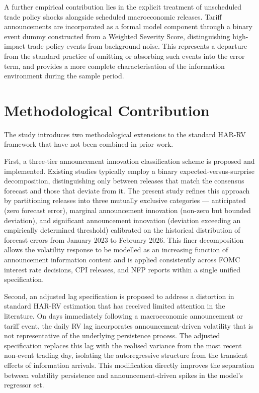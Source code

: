 \documentclass[12pt,a4paper]{report}
\begin{document}
A further empirical contribution lies in the explicit treatment of unscheduled trade policy shocks alongside scheduled macroeconomic releases. Tariff announcements are incorporated as a formal model component through a binary event dummy constructed from a Weighted Severity Score, distinguishing high-impact trade policy events from background noise. This represents a departure from the standard practice of omitting or absorbing such events into the error term, and provides a more complete characterisation of the information environment during the sample period.

\section{Methodological Contribution}
The study introduces two methodological extensions to the standard HAR-RV framework that have not been combined in prior work.

First, a three-tier announcement innovation classification scheme is proposed and implemented. Existing studies typically employ a binary expected-versus-surprise decomposition, distinguishing only between releases that match the consensus forecast and those that deviate from it. The present study refines this approach by partitioning releases into three mutually exclusive categories --- anticipated (zero forecast error), marginal announcement innovation (non-zero but bounded deviation), and significant announcement innovation (deviation exceeding an empirically determined threshold) calibrated on the historical distribution of forecast errors from January 2023 to February 2026. This finer decomposition allows the volatility response to be modelled as an increasing function of announcement information content and is applied consistently across FOMC interest rate decisions, CPI releases, and NFP reports within a single unified specification.

Second, an adjusted lag specification is proposed to address a distortion in standard HAR-RV estimation that has received limited attention in the literature. On days immediately following a macroeconomic announcement or tariff event, the daily RV lag incorporates announcement-driven volatility that is not representative of the underlying persistence process. The adjusted specification replaces this lag with the realised variance from the most recent non-event trading day, isolating the autoregressive structure from the transient effects of information arrivals. This modification directly improves the separation between volatility persistence and announcement-driven spikes in the model's regressor set.
\end{document}
